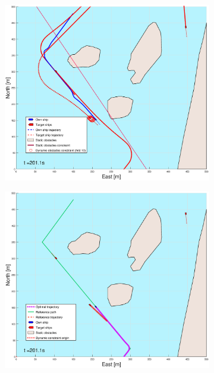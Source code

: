 \begin{figure}[ht]
\begin{subfigure}[b]{0.499\textwidth}
    \end{subfigure}
    \hfill
    \\
    \begin{subfigure}[b]{0.49\textwidth}
        \centering
        \includegraphics[width=\textwidth]{Images/Figures/Helloya_Rev/_Simple_1fig1_time=201}
    \end{subfigure}
    \hfill
    \begin{subfigure}[b]{0.499\textwidth}
        \centering
        \includegraphics[width=\textwidth]{Images/Figures/Helloya_Rev/_Simple_1fig999_time=201}

\end{subfigure}
\end{figure}
